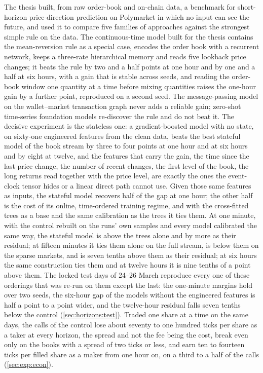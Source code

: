 The thesis built, from raw order-book and on-chain data, a benchmark for short-horizon
price-direction prediction on Polymarket in which no input can see the future, and used it
to compare five families of approaches against the strongest simple rule on the data.  The
continuous-time model built for the thesis contains the mean-reversion rule as a special
case, encodes the order book with a recurrent network, keeps a three-rate hierarchical memory
and reads five lookback price changes; it beats the rule by two and a half points at one hour
and by one and a half at six hours, with a gain that is stable across seeds, and reading the order-book
window one quantity at a time before mixing quantities raises the one-hour gain by a further
point, reproduced on a second seed.  The message-passing model on the wallet--market
transaction graph never adds a reliable gain; zero-shot time-series foundation models re-discover the rule and do not beat
it.  The decisive experiment is the stateless one: a gradient-boosted model with no state, on
sixty-one engineered features from the clean data, beats the best stateful model of the
book stream by three to four points at one hour and at six hours and by eight at twelve, and
the features
that carry the gain, the time since the last price change, the number of recent changes, the
first level of the book, the long returns read together with the price level, are exactly
the ones the event-clock tensor hides or a linear direct path cannot use.  Given those same
features as inputs, the stateful model recovers half of the gap at one hour; the other half
is the cost of its online, time-ordered training regime, and with the cross-fitted trees as
a base and the same calibration as the trees it ties them.  At one minute, with the control
rebuilt on the runs' own samples and every model calibrated the same way, the stateful model
is above the trees alone and by more as their residual; at fifteen minutes it ties them
alone on the full stream, is below them on the sparse markets, and is seven tenths above
them as their residual; at six hours the same
construction ties them and at twelve hours it is nine tenths of a point above them.  The
locked test days of 24--26 March reproduce every one of these orderings that was re-run on
them except the last: the one-minute margins hold over two seeds, the six-hour gap of the
models without the engineered features is half a point to a point wider, and the
twelve-hour residual falls seven tenths below the control (\cref{sec:horizons:test}).  Traded one share at a time on the same days, the calls of
the control lose about seventy to one hundred ticks per share as a taker at every horizon, the
spread and not the fee being the cost, break even only on the books with a spread of two
ticks or less, and earn ten to fourteen ticks per filled share as a maker from one hour on,
on a third to a half of the calls (\cref{sec:exp:econ}).

